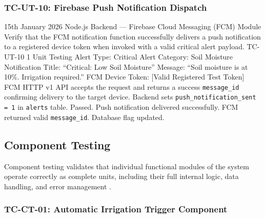 \subsubsection{TC-UT-10: Firebase Push Notification Dispatch}

\testcase%
{15th January 2026}%
{Node.js Backend --- Firebase Cloud Messaging (FCM) Module}%
{Verify that the FCM notification function successfully
delivers a push notification to a registered device token
when invoked with a valid critical alert payload.}%
{TC-UT-10}%
{1}%
{Unit Testing}%
{Alert Type: Critical \newline
Alert Category: Soil Moisture \newline
Notification Title: ``Critical: Low Soil Moisture'' \newline
Message: ``Soil moisture is at 10\%. Irrigation required.''
\newline
FCM Device Token: [Valid Registered Test Token]}%
{FCM HTTP v1 API accepts the request and returns a success
\texttt{message\_id} confirming delivery to the target
device. Backend sets \texttt{push\_notification\_sent = 1}
in \texttt{alerts} table.}%
{Passed. Push notification delivered successfully. FCM
returned valid \texttt{message\_id}. Database flag updated.}

\subsection{Component Testing}

Component testing validates that individual functional
modules of the system operate correctly as complete units,
including their full internal logic, data handling, and
error management \cite{sommerville2016software}.

\subsubsection{TC-CT-01: Automatic Irrigation Trigger Component}

